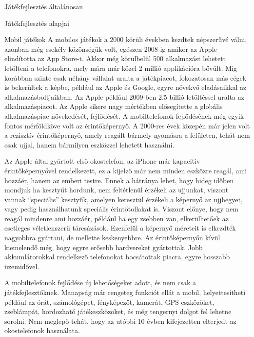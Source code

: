 \begin{MyChapter}{Játékfejlesztés általánosan}
\begin{MySection}{Játékfejlesztés alapjai}
		\begin{MySubSection}{Mobil játékok}
		A mobilos játékok a 2000 körüli években kezdtek népszerűvé válni, azonban még csekély közönségük volt, egészen 2008-ig amikor az Apple elindította az App Store-t. Akkor még körülbelül 500 alkalmazást lehetett letölteni a telefonokra, mely mára már közel 2 millió applikációra bővült.
		\cite{app_store}
		Míg korábban szinte csak néhány vállalat uralta a játékpiacot, fokozatosan más cégek is bekerültek a képbe, például az Apple és Google, egyre növekvő eladásaikkal az alkalmazásboltjaikban. Az Apple például 2009-ben 2.5 billió letöltéssel uralta az alkalmazáspiacot. Az Apple sikere nagy mértékben elősegítette a globális alkalmazáspiac növekedését, fejlődését.
		A mobiltelefonok fejlődésének még egyik fontos mérföldköve volt az érintőképernyő. A 2000-res évek közepén már jelen volt a rezisztív érintőképernyő, amely reagált bármely nyomásra a felületen, tehát nem csak ujjal, hanem bármilyen eszközzel lehetett használni.
		\cite{mobil_app_market}
		\cite{smartphone}
		
		Az Apple által gyártott első okostelefon, az iPhone már kapacitív érintőképernyővel rendelkezett, ez a kijelző már nem minden eszközre reagál, ami hozzáér, hanem az emberi testre. Ennek a hátránya lehet, hogy hideg időben mondjuk ha kesztyűt hordunk, nem feltétlenül érzékeli az ujjunkat, viszont vannak ``speciális'' kesztyűk, amelyen keresztül érzékeli a képernyő az ujjhegyet, vagy pedig használhatunk speciális érintőtollakat is. 
		\cite{touchscreen}
		Viszont előnye, hogy nem reagál mindenre ami hozzáér, például ha egy zsebben van, elkerülhetőek az esetleges véletlenszerű tárcsázások.
		Ezenfelül a képernyő méreteit is elkezdték nagyobbra gyártani, de mellette keskenyebbre. Az érintőképernyőn kívül kiemelendő még, hogy egyre erősebb hardvereket gyártottak. Jobb akkumlátorokkal rendelkező telefonokat bocsátottak piacra, egyre hosszabb üzemidővel.
		
		A mobiltelefonok fejlődése új lehetőségeket adott, és nem csak a játékfejlesztőknek. Manapság már rengeteg funkciót ellát a mobil, helyettesítheti például az órát, számológépet, fényképezőt, kamerát, GPS eszközöket, zseblámpát, hordozható játékeszközöket, és még tengernyi dolgot fel lehetne sorolni. Nem meglepő tehát, hogy az utóbbi 10 évben kifejezetten elterjedt az okostelefonok használata.
		

\end{MySubSection}
\end{MySection}
\end{MyChapter}
